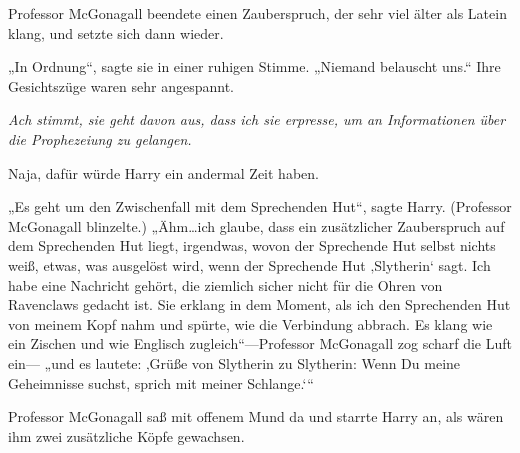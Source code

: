 Professor McGonagall beendete einen Zauberspruch, der sehr viel älter als Latein klang, und setzte sich dann wieder.

„In Ordnung“, sagte sie in einer ruhigen Stimme. „Niemand belauscht uns.“ Ihre Gesichtszüge waren sehr angespannt.

\emph{Ach stimmt, sie geht davon aus, dass ich sie erpresse, um an Informationen über die Prophezeiung zu gelangen.}

Naja, dafür würde Harry ein andermal Zeit haben.

„Es geht um den Zwischenfall mit dem Sprechenden Hut“, sagte Harry. (Professor McGonagall blinzelte.) „Ähm…ich glaube, dass ein zusätzlicher Zauberspruch auf dem Sprechenden Hut liegt, irgendwas, wovon der Sprechende Hut selbst nichts weiß, etwas, was ausgelöst wird, wenn der Sprechende Hut ‚Slytherin‘ sagt. Ich habe eine Nachricht gehört, die ziemlich sicher nicht für die Ohren von Ravenclaws gedacht ist. Sie erklang in dem Moment, als ich den Sprechenden Hut von meinem Kopf nahm und spürte, wie die Verbindung abbrach. Es klang wie ein Zischen und wie Englisch zugleich“—Professor McGonagall zog scharf die Luft ein— „und es lautete: ‚Grüße von Slytherin zu Slytherin: Wenn Du meine Geheimnisse suchst, sprich mit meiner Schlange.‘“

Professor McGonagall saß mit offenem Mund da und starrte Harry an, als wären ihm zwei zusätzliche Köpfe gewachsen.


